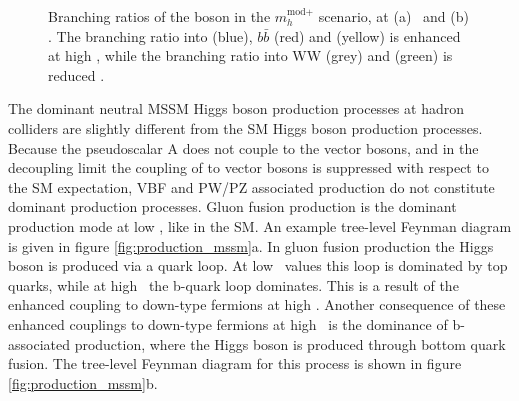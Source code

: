 \begin{figure}[h!]
\begin{center}
\end{center}
\caption{Branching ratios of the \PHiggs boson in the $m_{h}^{\text{mod+}}$ scenario,
at (a) ~and (b) . The branching ratio into \Pgt\Pgt (blue), $b\bar{b}$ (red) 
and \Pgm\Pgm (yellow) is enhanced at high \tanb, while the branching ratio into 
WW (grey) and \ttbar (green) is reduced \cite{MSSM-xswg-twiki}.}
\label{fig:mssm_brtautau}
\end{figure}

The dominant neutral MSSM Higgs boson production processes at hadron colliders
are slightly different from the \ac{SM} Higgs boson production processes. 
Because the pseudoscalar A does not couple to the
vector bosons, and in the decoupling limit the coupling of \PHiggs to vector
bosons is suppressed with respect to the \ac{SM} expectation, VBF and PW/PZ associated
production do not constitute dominant production processes. Gluon fusion production is 
the dominant production mode at low \tanb, like in the \ac{SM}. An example tree-level Feynman diagram is given in figure \ref{fig:production_mssm}a. In gluon fusion production the Higgs boson
is produced via a quark loop. At low \tanb~values this loop is dominated by top quarks, while at 
high \tanb~the b-quark loop dominates. This is a result of the enhanced coupling to down-type fermions at high \tanb. Another consequence of these enhanced couplings to down-type fermions at high \tanb~is the dominance of b-associated production, where the Higgs boson is produced through
bottom quark fusion. The tree-level Feynman diagram for this process is shown in figure \ref{fig:production_mssm}b.

